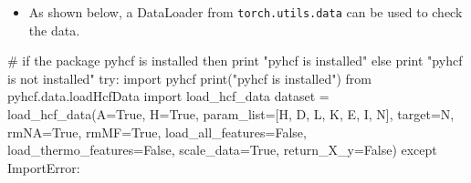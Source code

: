 \documentclass[
  letterpaper,
  DIV=11,
  numbers=noendperiod]{scrreprt}
\newenvironment{Shaded}{\begin{snugshade}}{\end{snugshade}}
\newcommand{\BuiltInTok}[1]{\textcolor[rgb]{0.00,0.23,0.31}{#1}}
\newcommand{\CommentTok}[1]{\textcolor[rgb]{0.37,0.37,0.37}{#1}}
\newcommand{\ControlFlowTok}[1]{\textcolor[rgb]{0.00,0.23,0.31}{#1}}
\newcommand{\ImportTok}[1]{\textcolor[rgb]{0.00,0.46,0.62}{#1}}
\newcommand{\NormalTok}[1]{\textcolor[rgb]{0.00,0.23,0.31}{#1}}
\newcommand{\OperatorTok}[1]{\textcolor[rgb]{0.37,0.37,0.37}{#1}}
\newcommand{\PreprocessorTok}[1]{\textcolor[rgb]{0.68,0.00,0.00}{#1}}
\newcommand{\StringTok}[1]{\textcolor[rgb]{0.13,0.47,0.30}{#1}}
\newcommand{\VariableTok}[1]{\textcolor[rgb]{0.07,0.07,0.07}{#1}}
\providecommand{\tightlist}{%
  \setlength{\itemsep}{0pt}\setlength{\parskip}{0pt}}\usepackage{longtable,booktabs,array}
\begin{document}
\begin{tcolorbox}[enhanced jigsaw, coltitle=black, bottomrule=.15mm, breakable, toprule=.15mm, colframe=quarto-callout-note-color-frame, title=\textcolor{quarto-callout-note-color}{\faInfo}\hspace{0.5em}{Note: Data Set and Data Loader}, colbacktitle=quarto-callout-note-color!10!white, opacityback=0, left=2mm, leftrule=.75mm, colback=white, rightrule=.15mm, bottomtitle=1mm, toptitle=1mm, titlerule=0mm, arc=.35mm, opacitybacktitle=0.6]

\begin{itemize}
\tightlist
\item
  As shown below, a DataLoader from \texttt{torch.utils.data} can be
  used to check the data.
\end{itemize}

\begin{Shaded}
\begin{Highlighting}[]
\CommentTok{\# if the package pyhcf is installed then print "pyhcf is installed" else print "pyhcf is not installed"}
\ControlFlowTok{try}\NormalTok{:}
    \ImportTok{import}\NormalTok{ pyhcf}
    \BuiltInTok{print}\NormalTok{(}\StringTok{"pyhcf is installed"}\NormalTok{)}
    \ImportTok{from}\NormalTok{ pyhcf.data.loadHcfData }\ImportTok{import}\NormalTok{ load\_hcf\_data}
\NormalTok{    dataset }\OperatorTok{=}\NormalTok{ load\_hcf\_data(A}\OperatorTok{=}\VariableTok{True}\NormalTok{, H}\OperatorTok{=}\VariableTok{True}\NormalTok{,}
\NormalTok{                        param\_list}\OperatorTok{=}\NormalTok{[}\StringTok{\textquotesingle{}H\textquotesingle{}}\NormalTok{, }\StringTok{\textquotesingle{}D\textquotesingle{}}\NormalTok{, }\StringTok{\textquotesingle{}L\textquotesingle{}}\NormalTok{, }\StringTok{\textquotesingle{}K\textquotesingle{}}\NormalTok{, }\StringTok{\textquotesingle{}E\textquotesingle{}}\NormalTok{, }\StringTok{\textquotesingle{}I\textquotesingle{}}\NormalTok{, }\StringTok{\textquotesingle{}N\textquotesingle{}}\NormalTok{],}
\NormalTok{                        target}\OperatorTok{=}\StringTok{\textquotesingle{}N\textquotesingle{}}\NormalTok{, rmNA}\OperatorTok{=}\VariableTok{True}\NormalTok{, rmMF}\OperatorTok{=}\VariableTok{True}\NormalTok{, load\_all\_features}\OperatorTok{=}\VariableTok{False}\NormalTok{,}
\NormalTok{                        load\_thermo\_features}\OperatorTok{=}\VariableTok{False}\NormalTok{, scale\_data}\OperatorTok{=}\VariableTok{True}\NormalTok{, return\_X\_y}\OperatorTok{=}\VariableTok{False}\NormalTok{)}
\ControlFlowTok{except} \PreprocessorTok{ImportError}\NormalTok{:}

\end{Highlighting}
\end{Shaded}
\end{tcolorbox}
\end{document}
